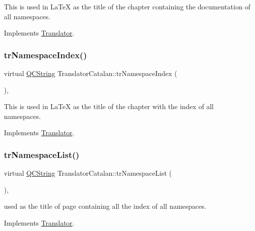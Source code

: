 This is used in La\+TeX as the title of the chapter containing the documentation of all namespaces. 

Implements \mbox{\hyperlink{class_translator}{Translator}}.

\mbox{\label{class_translator_catalan_a330e6e65105023d0cd584a3d676e5ff7}} 
\subsubsection{\texorpdfstring{trNamespaceIndex()}{trNamespaceIndex()}}
{\footnotesize\ttfamily virtual \mbox{\hyperlink{class_q_c_string}{Q\+C\+String}} Translator\+Catalan\+::tr\+Namespace\+Index (\begin{DoxyParamCaption}{ }\end{DoxyParamCaption})\hspace{0.3cm}{\ttfamily [inline]}, {\ttfamily [virtual]}}

This is used in La\+TeX as the title of the chapter with the index of all namespaces. 

Implements \mbox{\hyperlink{class_translator}{Translator}}.

\mbox{\label{class_translator_catalan_ae5375c53eedc40dafdbaba0753f8aa09}} 
\subsubsection{\texorpdfstring{trNamespaceList()}{trNamespaceList()}}
{\footnotesize\ttfamily virtual \mbox{\hyperlink{class_q_c_string}{Q\+C\+String}} Translator\+Catalan\+::tr\+Namespace\+List (\begin{DoxyParamCaption}{ }\end{DoxyParamCaption})\hspace{0.3cm}{\ttfamily [inline]}, {\ttfamily [virtual]}}

used as the title of page containing all the index of all namespaces. 

Implements \mbox{\hyperlink{class_translator}{Translator}}.

\mbox{\label{class_translator_catalan_adf05dffa5a4c3c78d35bfdcfb45260de}} 
